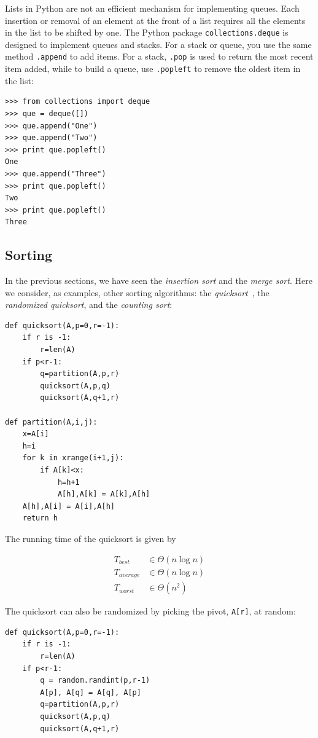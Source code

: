 \documentclass[justified,sixbynine]{tufte-book}
\def\ft{\small\tt}
\theoremstyle{plain}%
\theoremstyle{definition}
\theoremstyle{remark}
\begin{document}
\begin{fullwidth}
Lists in Python are not an efficient mechanism for implementing queues.  Each insertion or removal of an element at the front of a list requires all the elements in the list to be shifted by one. The Python package {\ft collections.deque} is designed to implement queues and stacks.  For a stack or queue, you use the same method {\ft .append} to add items.  For a stack, {\ft .pop} is used to return the most recent item added, while to build a queue, use {\ft .popleft} to remove the oldest item in the list:

\begin{lstlisting}
>>> from collections import deque
>>> que = deque([])
>>> que.append("One")
>>> que.append("Two")
>>> print que.popleft()
One
>>> que.append("Three")
>>> print que.popleft()
Two
>>> print que.popleft()
Three
\end{lstlisting}


\goodbreak\subsection{Sorting}


In the previous sections, we have seen the {\it insertion sort} and the {\it merge sort}. Here we consider, as examples, other sorting algorithms: the {\it quicksort}~\cite{mergesort}, the {\it randomized quicksort}, and the {\it counting sort}:

\begin{lstlisting}
def quicksort(A,p=0,r=-1):
    if r is -1:
        r=len(A)
    if p<r-1:
        q=partition(A,p,r)
        quicksort(A,p,q)
        quicksort(A,q+1,r)

def partition(A,i,j):
    x=A[i]
    h=i
    for k in xrange(i+1,j):
        if A[k]<x:
            h=h+1
            A[h],A[k] = A[k],A[h]
    A[h],A[i] = A[i],A[h]
    return h
\end{lstlisting}

The running time of the quicksort is given by

\begin{align}
T_{best} &\in \Theta (n\log n) \\
T_{average} &\in \Theta (n\log n) \\
T_{worst} &\in \Theta (n^2)
\end{align}

The quicksort can also be randomized by picking the pivot, {\ft A[r]}, at random:
\begin{lstlisting}
def quicksort(A,p=0,r=-1):
    if r is -1:
        r=len(A)
    if p<r-1:
        q = random.randint(p,r-1)
        A[p], A[q] = A[q], A[p]
        q=partition(A,p,r)
        quicksort(A,p,q)
        quicksort(A,q+1,r)
\end{lstlisting}


\end{fullwidth}
\end{document}
